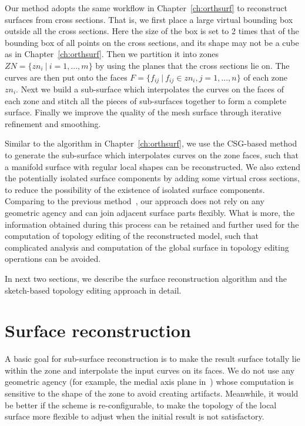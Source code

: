 Our method adopts  the same workflow in Chapter~\ref{ch:orthsurf} to
reconstruct surfaces from cross sections. That is, we first place a
large virtual bounding box outside all the cross sections. Here the
size of the box is set to 2 times that of the bounding box of all
points on the cross sections, and its shape may not be a cube as in
Chapter~\ref{ch:orthsurf}. Then we partition it into zones
$ZN=\{zn_i~|~i=1,...,m\}$ by using the planes that the cross
sections lie on. The curves are then put onto the faces
$F=\{f_{ij}~|~f_{ij}\in zn_i,j=1,...,n\}$ of each zone $zn_i$. Next
we build a sub-surface which interpolates the curves on the faces of
each zone and stitch all the pieces of sub-surfaces together to form
a complete surface. Finally we improve the quality of the mesh
surface through iterative refinement and smoothing.

Similar to  the algorithm in Chapter~\ref{ch:orthsurf}, we use the
CSG-based method to generate the sub-surface which interpolates
curves on the zone faces, such that a manifold surface with regular
local shapes can be reconstructed. We also extend the potentially
isolated surface components by adding some virtual cross sections,
to reduce the possibility of the existence of isolated surface
components. Comparing to the previous method~\cite{LBDLJ08}, our
approach does not rely on any geometric agency and can join adjacent
surface parts flexibly. What is more, the information obtained
during this process can be retained and further used for the
computation of topology editing of the reconstructed model, such
that complicated analysis and computation of the global surface in
topology editing operations can be avoided.

In next two sections, we describe the surface reconstruction
algorithm and the sketch-based topology editing approach in detail.



\section{Surface reconstruction}
\label{ch6:sec:reconst}

A basic goal for sub-surface reconstruction is  to make the result
surface totally lie within the zone and interpolate the input curves
on its faces. We do not use any geometric agency (for example, the
medial axis plane in~\cite{LBDLJ08}) whose computation is sensitive
to the shape of the zone to avoid creating artifacts. Meanwhile, it
would be better if the scheme is re-configurable, to make the
topology of the local surface more flexible to adjust when the
initial result is not satisfactory.

